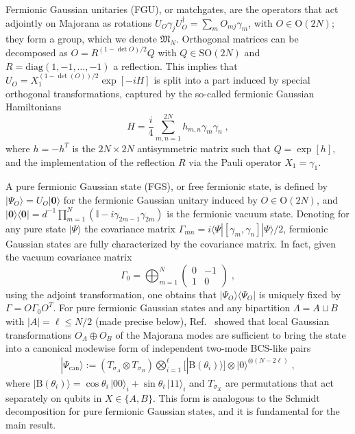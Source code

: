 \documentclass[prx,twocolumn,superscriptaddress,aps,10pt, frontmatterverbose, reprint,footinbib,longbibliography=true]{revtex4-2}
\begin{document}
Fermionic Gaussian unitaries (FGU), or matchgates, are the operators that act adjointly on Majorana as rotations $U_O\gamma_j U_O^\dagger = \sum_{m}O_{mj}\gamma_m$, with $O\in \mathrm{O}(2N)$; they form a group, which we denote $\mathfrak{M}_N$. 
Orthogonal matrices can be decomposed as $O=R^{(1-\det O)/2}Q$ with $Q\in \mathrm{SO}(2N)$ and $R=\mathrm{diag}(1,-1,\dots,-1)$  a reflection.
This implies that $U_O=X_1^{(1-\det(O))/2}\exp[-iH]$ is split into a part induced by special orthogonal transformations, captured by the so-called fermionic Gaussian Hamiltonians 
\begin{equation}
    H= \frac{i}{4}\sum_{m,n=1}^{2N} h_{m,n} \gamma_m\gamma_n\;,\label{eq:ham}
\end{equation}
where $h=-h^T$ is the $2N\times 2N$ antisymmetric matrix such that $Q=\exp[h]$, and the implementation of the reflection $R$ via the Pauli operator $X_1=\gamma_1$. 

A pure fermionic Gaussian state (FGS), or free fermionic state, is defined by $|\Psi_O\rangle=U_O|\mathbf{0}\rangle$ for the fermionic Gaussian unitary induced by $O\in \mathrm{O}(2N)$, and $|\mathbf{0}\rangle\langle\mathbf{0}| = d^{-1}\prod_{m=1}^{N}(\mathbb{I}-i\gamma_{2m-1}\gamma_{2m})$ is the fermionic vacuum state. 
Denoting for any pure state $|\Psi\rangle$ the covariance matrix $\Gamma_{mn}=i\langle \Psi|[\gamma_m,\gamma_n]|\Psi\rangle/2$, fermionic Gaussian states are fully characterized by the covariance matrix. In fact, given the vacuum covariance matrix
\begin{equation}
    \Gamma_0= { \bigoplus_{m=1}^N \begin{pmatrix}
        0 &-1 \\1&0
    \end{pmatrix}}\;,
\end{equation}
using the adjoint transformation, one obtains that $|\Psi_O\rangle\langle \Psi_O|$ is uniquely fixed by $\Gamma= O\Gamma_0 O^T$. 
For pure fermionic Gaussian states and any bipartition $\Lambda=A\sqcup B$ with $|A|=\ell\le N/2$ (made precise below), Ref.~\cite{BoteroReznik2004} showed that local Gaussian transformations $O_A\oplus O_B$ of the Majorana modes are sufficient to bring the state into a canonical modewise form of independent two-mode BCS-like pairs 
\begin{equation}
\begin{split}
     |\Psi_{\mathrm{can}}\rangle
:= (T_{\sigma_{A}}\otimes T_{\sigma_{B}})\bigotimes_{i=1}^{\ell} [|\mathrm{B}(\theta_i)\rangle]\otimes |0\rangle^{\otimes (N-2\ell)}\;,
\end{split}
\label{eq:can_form}
\end{equation} 
where $|\mathrm{B}(\theta_i)\rangle=\cos\theta_i\,|00\rangle_i+\sin\theta_i\,|11\rangle_i$  and $T_{\sigma_X}$ are permutations that act separately on qubits in $X\in \{A,B\}$. This form is analogous to the Schmidt decomposition for pure fermionic Gaussian states, and it is fundamental for the main result.
\end{document}
